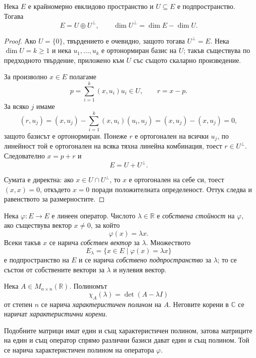 \begin{prop}
Нека $E$ е крайномерно евклидово пространство и $U\subseteq E$ е подпространство. Тогава
\[
E=U\oplus U^\perp,
\qquad
\dim U^\perp=\dim E-\dim U.
\]
\end{prop}

\begin{proof}
Ако $U=\{0\}$, твърдението е очевидно, защото тогава $U^\perp=E$. Нека $\dim U=k\geq1$ и нека $u_1,\ldots,u_k$ е ортонормиран базис на $U$; такъв съществува по предходното твърдение, приложено към $U$ със същото скаларно произведение.

За произволно $x\in E$ полагаме
\[
p=\sum_{i=1}^k (x,u_i)u_i\in U,
\qquad
r=x-p.
\]
За всяко $j$ имаме
\[
(r,u_j)=(x,u_j)-\sum_{i=1}^k (x,u_i)(u_i,u_j)=(x,u_j)-(x,u_j)=0,
\]
защото базисът е ортонормиран. Понеже $r$ е ортогонален на всички $u_j$, по линейност той е ортогонален на всяка тяхна линейна комбинация, тоест $r\in U^\perp$. Следователно $x=p+r$ и
\[
E=U+U^\perp.
\]

Сумата е директна: ако $x\in U\cap U^\perp$, то $x$ е ортогонален на себе си, тоест $(x,x)=0$, откъдето $x=0$ поради положителната определеност. Оттук следва и равенството за размерностите.
\end{proof}

\begin{defn}
Нека $\varphi:E\to E$ е линеен оператор. Числото $\lambda\in\mathbb{R}$ е \emph{собствена стойност} на $\varphi$, ако съществува вектор $x\ne0$, за който
\[
\varphi(x)=\lambda x.
\]
Всеки такъв $x$ се нарича \emph{собствен вектор} за $\lambda$. Множеството
\[
E_\lambda=\{x\in E\mid \varphi(x)=\lambda x\}
\]
е подпространство на $E$ и се нарича \emph{собствено подпространство} за $\lambda$; то се състои от собствените вектори за $\lambda$ и нулевия вектор.
\end{defn}

\begin{defn}
Нека $A\in M_{n\times n}(\mathbb{R})$. Полиномът
\[
\chi_A(\lambda)=\det(A-\lambda I)
\]
от степен $n$ се нарича \emph{характеристичен полином} на $A$. Неговите корени в $\mathbb{C}$ се наричат \emph{характеристични корени}.

Подобните матрици имат един и същ характеристичен полином, затова матриците на един и същ оператор спрямо различни базиси дават един и същ полином. Той се нарича характеристичен полином на оператора $\varphi$.
\end{defn}


